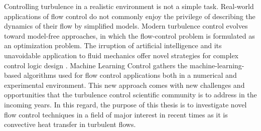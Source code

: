 Controlling turbulence in a realistic environment is not a simple task. Real-world applications of flow control do not commonly enjoy the privilege of describing the dynamics of their flow by simplified models. Modern turbulence control evolves toward model-free approaches, in which the flow-control problem is formulated as an optimization problem. The irruption of artificial intelligence and its unavoidable application to fluid mechanics offer novel strategies for complex control logic design \citep{BruntonNoack2015review}. Machine Learning Control \citep[MLC,][]{duriez2017book} gathers the machine-learning-based algorithms used for flow control applications both in a numerical and experimental environment. This new approach comes with new challenges and opportunities that the turbulence control scientific community is to address in the incoming years. In this regard, the purpose of this thesis is to investigate novel flow control techniques in a field of major interest in recent times as it is convective heat transfer in turbulent flows.
 
